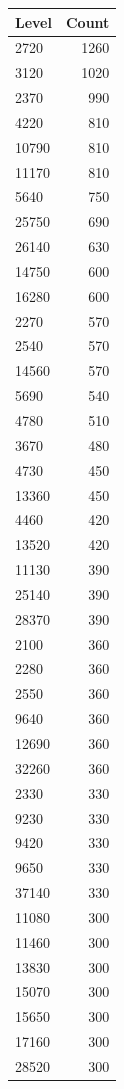\begin{table}[ht]
\centering
\begin{tabular}{lr}
  \hline
Level & Count \\ 
  \hline
2720 & 1260 \\ 
  3120 & 1020 \\ 
  2370 & 990 \\ 
  4220 & 810 \\ 
  10790 & 810 \\ 
  11170 & 810 \\ 
  5640 & 750 \\ 
  25750 & 690 \\ 
  26140 & 630 \\ 
  14750 & 600 \\ 
  16280 & 600 \\ 
  2270 & 570 \\ 
  2540 & 570 \\ 
  14560 & 570 \\ 
  5690 & 540 \\ 
  4780 & 510 \\ 
  3670 & 480 \\ 
  4730 & 450 \\ 
  13360 & 450 \\ 
  4460 & 420 \\ 
  13520 & 420 \\ 
  11130 & 390 \\ 
  25140 & 390 \\ 
  28370 & 390 \\ 
  2100 & 360 \\ 
  2280 & 360 \\ 
  2550 & 360 \\ 
  9640 & 360 \\ 
  12690 & 360 \\ 
  32260 & 360 \\ 
  2330 & 330 \\ 
  9230 & 330 \\ 
  9420 & 330 \\ 
  9650 & 330 \\ 
  37140 & 330 \\ 
  11080 & 300 \\ 
  11460 & 300 \\ 
  13830 & 300 \\ 
  15070 & 300 \\ 
  15650 & 300 \\ 
  17160 & 300 \\ 
  28520 & 300 \\ 

\end{tabular}
\end{table}
